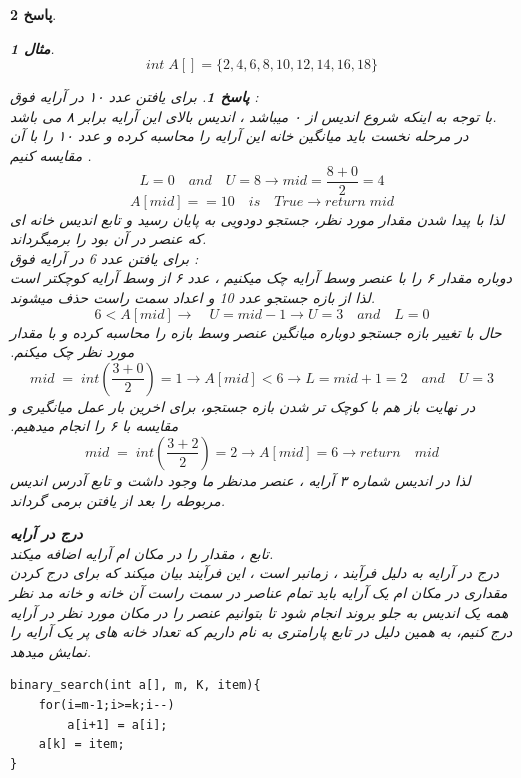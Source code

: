 \documentclass[12pt]{article}
\newtheorem{question}{مثال}[section]
\newtheorem{answer}{پاسخ}[section]
\begin{document}
\begin{answer}
\begin{question}
\[int \; A[] = \{2, 4, 6, 8, 10, 12, 14, 16, 18\}\]
\end{question}
\begin{answer}
برای یافتن عدد ۱۰ در آرایه فوق :\\
با توجه به اینکه شروع اندیس از ۰ میباشد ، اندیس بالای این آرایه برابر ۸ می باشد.\\
در مرحله نخست باید میانگین خانه این آرایه را محاسبه کرده و عدد ۱۰ را با آن مقایسه کنیم .\\
\[
L = 0 \quad and \quad U = 8 \rightarrow mid = \frac{8+0}{2} = 4
\]
\[
A[mid]  == 10\quad is\quad True  \rightarrow return \; mid
\]
لذا با پیدا شدن مقدار مورد نظر، جستجو دودویی به پایان رسید و تابع اندیس خانه ای که عنصر در آن بود را برمیگرداند.\\
\newline
برای یافتن عدد 6 در آرایه فوق :\\
دوباره مقدار ۶ را با عنصر وسط آرایه چک میکنیم ، عدد ۶ از وسط آرایه کوچکتر است لذا از بازه جستجو عدد 10 و اعداد سمت راست حذف میشوند.\\
\[
6 < A[mid] \rightarrow \quad U=mid-1 \rightarrow U = 3 \quad and\quad  L = 0
\]
حال با تغییر بازه جستجو دوباره میانگین عنصر وسط بازه را محاسبه کرده و با مقدار مورد نظر چک میکنم.
\[
 mid \; =\; int(\frac{3+0}{2})= 1 \rightarrow A[mid] < 6 \rightarrow
 L = mid + 1 = 2 \quad and \quad U = 3  
\]
در نهایت باز هم با کوچک تر شدن بازه جستجو، برای اخرین بار عمل میانگیری و مقایسه با ۶ را انجام میدهیم.
\[
mid \; =\; int(\frac{3+2}{2})= 2 \rightarrow A[mid] = 6 \rightarrow return \quad mid 
\]
لذا در اندیس شماره ۳ آرایه ، عنصر مدنظر ما وجود داشت و تابع آدرس اندیس مربوطه را بعد از یافتن برمی گرداند.\\
\end{answer}
\newpage

\textbf{درج در آرایه \;}\\
تابع ، مقدار  را در مکان  ام آرایه  اضافه میکند.\\
درج در آرایه به دلیل فرآیند ، زمانبر است ، این فرآیند بیان میکند که برای درج کردن مقداری در مکان ام یک آرایه باید تمام عناصر در سمت راست آن خانه و خانه مد نظر همه یک اندیس به جلو بروند انجام شود تا بتوانیم عنصر را در مکان مورد نظر در آرایه درج کنیم، به همین دلیل در تابع پارامتری به نام  داریم که تعداد خانه های پر یک آرایه را نمایش میدهد.\\
\begin{latin}
\begin{lstlisting}
binary_search(int a[], m, K, item){
	for(i=m-1;i>=k;i--)
		a[i+1] = a[i];	
	a[k] = item;
}
\end{lstlisting}
\end{latin}\\


\end{answer}
\end{document}
